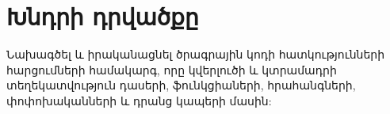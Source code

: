 {
	\clearpage
	\section{Խնդրի դրվածքը}\label{sec:problemFormulation}
	Նախագծել և իրականացնել ծրագրային կոդի հատկությունների հարցումների համակարգ,
	որը կվերլուծի և կտրամադրի տեղեկատվություն դասերի, ֆունկցիաների,
	հրահանգների, փոփոխականների և դրանց կապերի մասին:
}